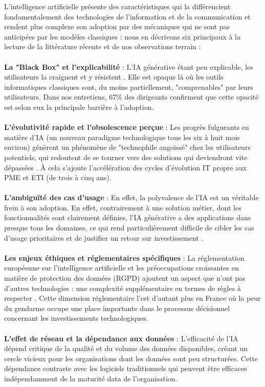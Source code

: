 L’intelligence artificielle présente des caractéristiques qui la différencient fondamentalement des technologies de l’information et de la communication et rendent plus complexe son adoption par des mécaniques qui ne sont pas anticipées par les modèles classiques : nous en décrivons six principaux à la lecture de la littérature récente et de nos observations terrain :
\\\\
\textbf{La "Black Box" et l'explicabilité} : L'IA générative étant peu explicable, les utilisateurs la craignent et y résistent \cite{fountaine2019building}. Elle est opaque là où les outils informatiques classiques sont, du moins partiellement, "comprenables" par leurs utilisateurs. Dans nos entretiens, 67\% des dirigeants confirment que cette opacité est selon eux la principale barrière à l'adoption.
\\\\
\textbf{L'évolutivité rapide et l'obsolescence perçue} : Les progrès fulgurants en matière d'IA (un nouveau paradigme technologique tous les six à huit mois environ) génèrent un phénomène de "technophile angoissé" chez les utilisateurs potentiels, qui redoutent de se tourner vers des solutions qui deviendront vite dépassées \cite{ransbotham2023expanding}. À cela s'ajoute l'accélération des cycles d'évolution IT propre aux PME et ETI (de trois à cinq ans).
\\\\
\textbf{L'ambiguïté des cas d'usage} : En effet, la polyvalence de l'IA est un véritable frein à son adoption. En effet, contrairement à une solution métier, dont les fonctionnalités sont clairement définies, l'IA générative a des applications dans presque tous les domaines, ce qui rend particulièrement difficile de cibler les cas d'usage prioritaires et de justifier un retour sur investissement \cite{dwivedi2021artificial}.
\\\\
\textbf{Les enjeux éthiques et réglementaires spécifiques} : La réglementation européenne sur l'intelligence artificielle et les préoccupations croissantes en matière de protection des données (RGPD) ajoutent un aspect que n'ont pas d'autres technologies : une complexité supplémentaire en termes de règles à respecter \cite{bertolucci2024artificial}. Cette dimension réglementaire l'est d'autant plus en France où la peur du gendarme occupe une place importante dans le processus décisionnel concernant les investissements technologiques.
\\\\
\textbf{L'effet de réseau et la dépendance aux données} : L'efficacité de l'IA dépend critique de la qualité et du volume des données disponibles, créant un cercle vicieux pour les organisations dont les données sont peu structurées. Cette dépendance contraste avec les logiciels traditionnels qui peuvent être efficaces indépendamment de la maturité data de l'organisation.

